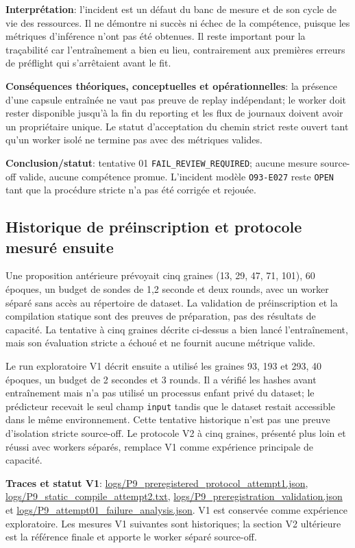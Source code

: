 \documentclass[11pt,a4paper,oneside]{report}
\begin{document}
\textbf{Interprétation}: l'incident est un défaut du banc de mesure et de son cycle de vie des ressources. Il ne démontre ni succès ni échec de la compétence, puisque les métriques d'inférence n'ont pas été obtenues. Il reste important pour la traçabilité car l'entraînement a bien eu lieu, contrairement aux premières erreurs de préflight qui s'arrêtaient avant le fit.

\textbf{Conséquences théoriques, conceptuelles et opérationnelles}: la présence d'une capsule entraînée ne vaut pas preuve de replay indépendant; le worker doit rester disponible jusqu'à la fin du reporting et les flux de journaux doivent avoir un propriétaire unique. Le statut d'acceptation du chemin strict reste ouvert tant qu'un worker isolé ne termine pas avec des métriques valides.

\textbf{Conclusion/statut}: tentative 01 \texttt{FAIL\_REVIEW\_REQUIRED}; aucune mesure source-off valide, aucune compétence promue. L'incident modèle \texttt{O93-E027} reste \texttt{OPEN} tant que la procédure stricte n'a pas été corrigée et rejouée.

\subsection{Historique de préinscription et protocole mesuré ensuite}
Une proposition antérieure prévoyait cinq graines (13, 29, 47, 71, 101), 60 époques, un budget de sondes de 1,2 seconde et deux rounds, avec un worker séparé sans accès au répertoire de dataset. La validation de préinscription et la compilation statique sont des preuves de préparation, pas des résultats de capacité. La tentative à cinq graines décrite ci-dessus a bien lancé l'entraînement, mais son évaluation stricte a échoué et ne fournit aucune métrique valide.

Le run exploratoire V1 décrit ensuite a utilisé les graines 93, 193 et 293, 40 époques, un budget de 2 secondes et 3 rounds. Il a vérifié les hashes avant entraînement mais n’a pas utilisé un processus enfant privé du dataset; le prédicteur recevait le seul champ \texttt{input} tandis que le dataset restait accessible dans le même environnement. Cette tentative historique n’est pas une preuve d’isolation stricte source-off. Le protocole V2 à cinq graines, présenté plus loin et réussi avec workers séparés, remplace V1 comme expérience principale de capacité.

\textbf{Traces et statut V1}: \url{logs/P9_preregistered_protocol_attempt1.json}, \url{logs/P9_static_compile_attempt2.txt}, \url{logs/P9_preregistration_validation.json} et \url{logs/P9_attempt01_failure_analysis.json}. V1 est conservée comme expérience exploratoire. Les mesures V1 suivantes sont historiques; la section V2 ultérieure est la référence finale et apporte le worker séparé source-off.
\end{document}

